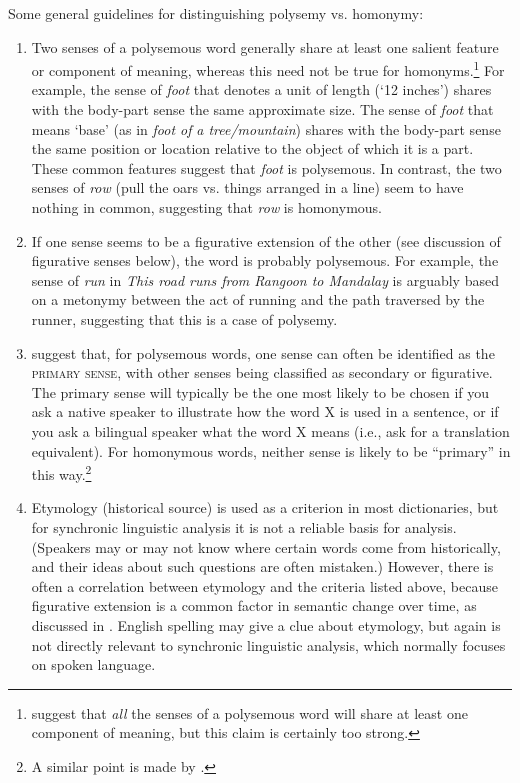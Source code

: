 Some general guidelines for distinguishing polysemy vs. homonymy:

\begin{enumerate}[label=\alph*.]
\item Two senses of a polysemous word generally share at least one salient feature or component of meaning, whereas this need not be true for homonyms.\footnote{\citet{BeekmanCallow1974} suggest that \textit{all} the senses of a polysemous word will share at least one component of meaning, but this claim is certainly too strong.} For example, the sense of \textit{foot} that denotes a unit of length (‘12 inches’) shares with the body-part sense the same approximate size. The sense of \textit{foot} that means ‘base’ (as in \textit{foot of} \textit{a tree/mountain}) shares with the body-part sense the same position or location relative to the object of which it is a part. These common features suggest that \textit{foot} is polysemous. In contrast, the two senses of \textit{row} (pull the oars vs. things arranged in a line) seem to have nothing in common, suggesting that \textit{row} is homonymous.
\item If one sense seems to be a figurative extension of the other (see discussion of figurative senses below), the word is probably polysemous. For example, the sense of \textit{run} in \textit{This road runs from Rangoon to Mandalay} is arguably based on a metonymy between the act of running and the path traversed by the runner, suggesting that this is a case of polysemy.
\item \citet{BeekmanCallow1974} suggest that, for polysemous words, one sense can often be identified as the \textsc{primary sense}, with other senses being classified as secondary or figurative. The primary sense will typically be the one most likely to be chosen if you ask a native speaker to illustrate how the word X is used in a sentence, or if you ask a bilingual speaker what the word X means (i.e., ask for a translation equivalent). For homonymous words, neither sense is likely to be “primary” in this way.\footnote{A similar point is made by    \citet[100]{FillmoreAtkins2000}.}
\item Etymology (historical source) is used as a criterion in most dictionaries, but for synchronic linguistic analysis it is not a reliable basis for analysis. (Speakers may or may not know where certain words come from historically, and their ideas about such questions are often mistaken.) However, there is often a correlation between etymology and the criteria listed above, because figurative extension is a common factor in semantic change over time, as discussed in . English spelling may give a clue about etymology, but again is not directly relevant to synchronic linguistic analysis, which normally focuses on spoken language.
\end{enumerate}

